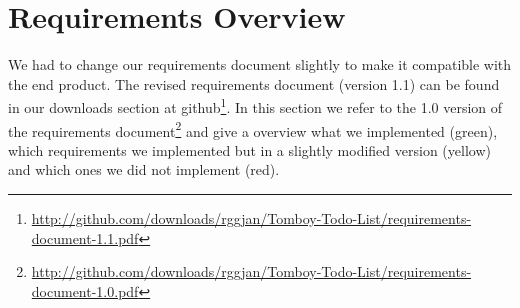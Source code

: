 \section{Requirements Overview}
\label{requirements}
We had to change our requirements document slightly to make it compatible with the end product. The revised requirements document (version 1.1) can be found in our downloads section at github\footnote{\url{http://github.com/downloads/rggjan/Tomboy-Todo-List/requirements-document-1.1.pdf}}.
In this section we refer to the 1.0 version of the requirements document\footnote{\url{http://github.com/downloads/rggjan/Tomboy-Todo-List/requirements-document-1.0.pdf}} and give a overview what we implemented (green), which requirements we implemented but in a slightly modified version (yellow) and which ones we did not implement (red).

